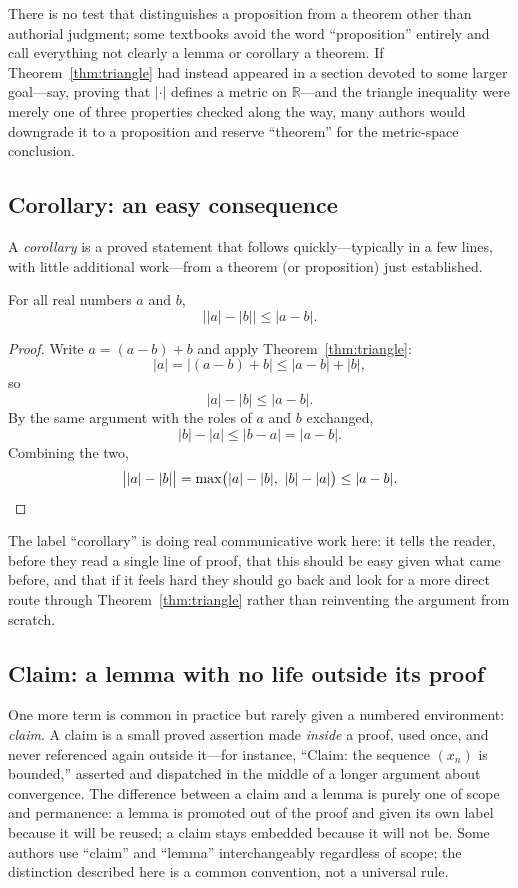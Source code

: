 \documentclass{essay}
\begin{document}
There is no test that distinguishes a proposition from a theorem other than authorial judgment; some textbooks avoid the word ``proposition'' entirely and call everything not clearly a lemma or corollary a theorem. If Theorem~\ref{thm:triangle} had instead appeared in a section devoted to some larger goal---say, proving that \(|\cdot|\) defines a metric on \(\mathbb{R}\)---and the triangle inequality were merely one of three properties checked along the way, many authors would downgrade it to a proposition and reserve ``theorem'' for the metric-space conclusion.

\subsection{Corollary: an easy consequence}

\begin{definition}
A \emph{corollary} is a proved statement that follows quickly---typically in a few lines, with little additional work---from a theorem (or proposition) just established.
\end{definition}

\begin{corollary}
\label{cor:reverse}
For all real numbers \(a\) and \(b\),
\[
\bigl||a|-|b|\bigr| \le |a-b|.
\]
\end{corollary}

\begin{proof}
Write \(a=(a-b)+b\) and apply Theorem~\ref{thm:triangle}:
\[
|a| = |(a-b)+b| \le |a-b|+|b|,
\]
so
\[
|a|-|b|\le |a-b|.
\]
By the same argument with the roles of \(a\) and \(b\) exchanged,
\[
|b|-|a|\le |b-a| = |a-b|.
\]
Combining the two,
\[
\bigl||a|-|b|\bigr| = \max\bigl(|a|-|b|,\ |b|-|a|\bigr) \le |a-b|.
\qedhere
\]
\end{proof}

The label ``corollary'' is doing real communicative work here: it tells the reader, before they read a single line of proof, that this should be easy given what came before, and that if it feels hard they should go back and look for a more direct route through Theorem~\ref{thm:triangle} rather than reinventing the argument from scratch.

\subsection{Claim: a lemma with no life outside its proof}

One more term is common in practice but rarely given a numbered environment: \emph{claim}. A claim is a small proved assertion made \emph{inside} a proof, used once, and never referenced again outside it---for instance, ``Claim: the sequence \((x_n)\) is bounded,'' asserted and dispatched in the middle of a longer argument about convergence. The difference between a claim and a lemma is purely one of scope and permanence: a lemma is promoted out of the proof and given its own label because it will be reused; a claim stays embedded because it will not be. Some authors use ``claim'' and ``lemma'' interchangeably regardless of scope; the distinction described here is a common convention, not a universal rule.
\end{document}

